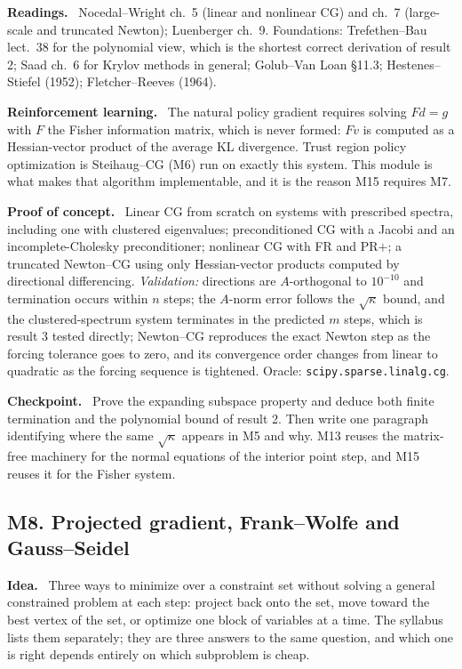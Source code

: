 \documentclass[11pt,a4paper]{article}
\newcommand{\mpart}[1]{\smallskip\noindent\textbf{#1}\ \ignorespaces}
\begin{document}
\mpart{Readings.} Nocedal--Wright ch.~5 (linear and nonlinear CG) and ch.~7 (large-scale and
truncated Newton); Luenberger ch.~9. Foundations: Trefethen--Bau lect.~38 for the polynomial
view, which is the shortest correct derivation of result 2; Saad ch.~6 for Krylov methods in
general; Golub--Van Loan \S 11.3; Hestenes--Stiefel (1952); Fletcher--Reeves (1964).

\mpart{Reinforcement learning.} The natural policy gradient requires solving $F d = g$ with
$F$ the Fisher information matrix, which is never formed: $Fv$ is computed as a
Hessian-vector product of the average KL divergence. Trust region policy optimization is
Steihaug--CG (M6) run on exactly this system. This module is what makes that algorithm
implementable, and it is the reason M15 requires M7.

\mpart{Proof of concept.} Linear CG from scratch on systems with prescribed spectra, including
one with clustered eigenvalues; preconditioned CG with a Jacobi and an incomplete-Cholesky
preconditioner; nonlinear CG with FR and PR$+$; a truncated Newton--CG using only
Hessian-vector products computed by directional differencing. \emph{Validation:} directions
are $A$-orthogonal to $10^{-10}$ and termination occurs within $n$ steps; the $A$-norm error
follows the $\sqrt\kappa$ bound, and the clustered-spectrum system terminates in the predicted
$m$ steps, which is result 3 tested directly; Newton--CG reproduces the exact Newton step as
the forcing tolerance goes to zero, and its convergence order changes from linear to quadratic
as the forcing sequence is tightened. Oracle: \texttt{scipy.sparse.linalg.cg}.

\mpart{Checkpoint.} Prove the expanding subspace property and deduce both finite termination
and the polynomial bound of result 2. Then write one paragraph identifying where the same
$\sqrt\kappa$ appears in M5 and why. M13 reuses the matrix-free machinery for the normal
equations of the interior point step, and M15 reuses it for the Fisher system.

\subsection{M8. Projected gradient, Frank--Wolfe and Gauss--Seidel}

\mpart{Idea.} Three ways to minimize over a constraint set without solving a general
constrained problem at each step: project back onto the set, move toward the best vertex of
the set, or optimize one block of variables at a time. The syllabus lists them separately;
they are three answers to the same question, and which one is right depends entirely on which
subproblem is cheap.
\end{document}
